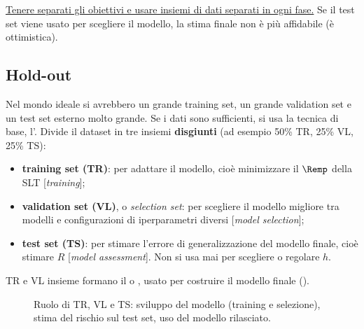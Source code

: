 \begin{attenzione}
\uline{Tenere separati gli obiettivi e usare insiemi di dati separati in ogni fase.} Se il test set viene usato
per scegliere il modello, la stima finale non è più affidabile (è ottimistica).
\end{attenzione}

\subsection{Hold-out}

Nel mondo ideale si avrebbero un grande training set, un grande validation set e un test set esterno molto
grande. Se i dati sono sufficienti, si usa la tecnica di base, l'. Divide il dataset in tre
insiemi \textbf{disgiunti} (ad esempio 50\% TR, 25\% VL, 25\% TS):
\begin{itemize}
  \item \textbf{training set (TR)}: per adattare il modello, cioè minimizzare il $\Remp$ della SLT
        [\emph{training}];
  \item \textbf{validation set (VL)}, o \emph{selection set}: per scegliere il modello migliore tra modelli e
        configurazioni di iperparametri diversi [\emph{model selection}];
  \item \textbf{test set (TS)}: per stimare l'errore di generalizzazione del modello finale, cioè stimare $R$
        [\emph{model assessment}]. Non si usa mai per scegliere o regolare $h$.
\end{itemize}
TR e VL insieme formano il  o , usato per costruire il modello finale
().

\begin{figure}[ht]
\centering
{}
\caption{Ruolo di TR, VL e TS: sviluppo del modello (training e selezione), stima del rischio sul test set, uso
del modello rilasciato.}
\label{fig:tr-vl-ts}
\end{figure}

